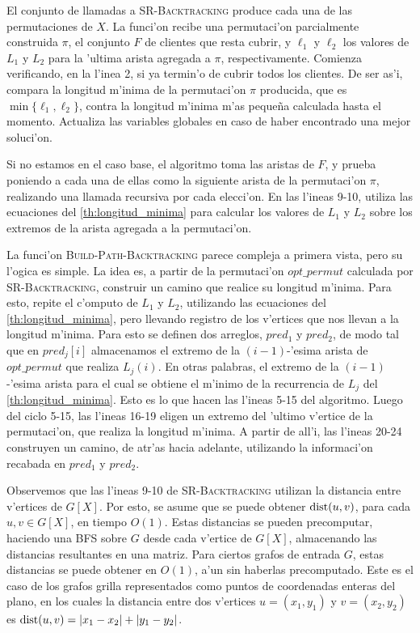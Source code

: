 El conjunto de llamadas a \textsc{SR-Backtracking} produce cada una de las permutaciones de $X$. La funci'on recibe una permutaci'on parcialmente construida $\pi$, el conjunto $F$ de clientes que resta cubrir, y $\ell_1$ y $\ell_2$ los valores de $L_1$ y $L_2$ para la 'ultima arista agregada a $\pi$, respectivamente. Comienza verificando, en la l'inea 2, si ya termin'o de cubrir todos los clientes. De ser as'i, compara la longitud m'inima de la permutaci'on $\pi$ producida, que es $\min\{\ell_1, \ell_2\}$, contra la longitud m'inima m'as peque\~na calculada hasta el momento. Actualiza las variables globales en caso de haber encontrado una mejor soluci'on.

Si no estamos en el caso base, el algoritmo toma las aristas de $F$, y prueba poniendo a cada una de ellas como la siguiente arista de la permutaci'on $\pi$, realizando una llamada recursiva por cada elecci'on. En las l'ineas 9-10, utiliza las ecuaciones del \autoref{th:longitud_minima} para calcular los valores de $L_1$ y $L_2$ sobre los extremos de la arista agregada a la permutaci'on.

La funci'on \textsc{Build-Path-Backtracking} parece compleja a primera vista, pero su l'ogica es simple. La idea es, a partir de la permutaci'on $opt\_permut$ calculada por \textsc{SR-Backtracking}, construir un camino que realice su longitud m'inima. Para esto, repite el c'omputo de $L_1$ y $L_2$, utilizando las ecuaciones del \autoref{th:longitud_minima}, pero llevando registro de los v'ertices que nos llevan a la longitud m'inima. Para esto se definen dos arreglos, $pred_1$ y $pred_2$, de modo tal que en $pred_j[i]$ almacenamos el extremo de la $(i - 1)$-'esima arista de $opt\_permut$ que realiza $L_j(i)$. En otras palabras, el extremo de la $(i - 1)$-'esima arista para el cual se obtiene el m'inimo de la recurrencia de $L_j$ del \autoref{th:longitud_minima}. Esto es lo que hacen las l'ineas 5-15 del algoritmo. Luego del ciclo 5-15, las l'ineas 16-19 eligen un extremo del 'ultimo v'ertice de la permutaci'on, que realiza la longitud m'inima. A partir de all'i, las l'ineas 20-24 construyen un camino, de atr'as hacia adelante, utilizando la informaci'on recabada en $pred_1$ y $pred_2$.

Observemos que las l'ineas 9-10 de \textsc{SR-Backtracking} utilizan la distancia entre v'ertices de $G[X]$. Por esto, se asume que se puede obtener $\textnormal{dist}(u, v)$, para cada $u, v \in G[X]$, en tiempo $O(1)$. Estas distancias se pueden precomputar, haciendo una BFS sobre $G$ desde cada v'ertice de $G[X]$, almacenando las distancias resultantes en una matriz. Para ciertos grafos de entrada $G$, estas distancias se puede obtener en $O(1)$, a'un sin haberlas precomputado. Este es el caso de los grafos grilla representados como puntos de coordenadas enteras del plano, en los cuales la distancia entre dos v'ertices $u = (x_1, y_1)$ y $v = (x_2, y_2)$ es $\textnormal{dist}(u, v) = |x_1 - x_2| + |y_1 - y_2|$.

